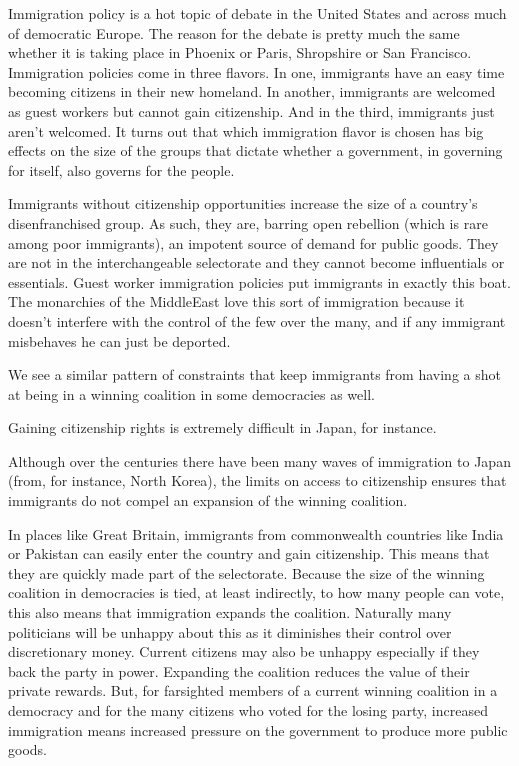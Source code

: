 \documentclass[10pt]{article}
\begin{document}
{\large Immigration policy is a hot topic of debate in the United States and
across much of democratic Europe. The reason for the debate is pretty much the
same whether it is taking place in Phoenix or Paris, Shropshire or San Francisco.
Immigration policies come in three flavors. In one, immigrants have an easy time
becoming citizens in their new homeland. In another, immigrants are welcomed as
guest workers but cannot gain citizenship. And in the third, immigrants just
aren't welcomed. It turns out that which immigration flavor is chosen has big
effects on the size of the groups that dictate whether a government, in governing
for itself, also governs for the people.}

{\large Immigrants without citizenship opportunities increase the size of a
country's disenfranchised group. As such, they are, barring open rebellion (which
is rare among poor immigrants), an impotent source of demand for public goods.
They are not in the interchangeable selectorate and they cannot become
influentials or essentials. Guest worker immigration policies put immigrants in
exactly this boat. The monarchies of the MiddleEast love this sort of immigration
because it doesn't interfere with the control of the few over the many, and if
any immigrant misbehaves he can just be deported.}

{\large We see a similar pattern of constraints that keep immigrants from having
a shot at being in a winning coalition in some democracies as well.}

{\large Gaining citizenship rights is extremely difficult in Japan, for
instance.}

{\large Although over the centuries there have been many waves of immigration to
Japan (from, for instance, North Korea), the limits on access to citizenship
ensures that immigrants do not compel an expansion of the winning coalition.}

{\large In places like Great Britain, immigrants from commonwealth countries
like India or Pakistan can easily enter the country and gain citizenship. This
means that they are quickly made part of the selectorate. Because the size of the
winning coalition in democracies is tied, at least indirectly, to how many people
can vote, this also means that immigration expands the coalition. Naturally many
politicians will be unhappy about this as it diminishes their control over
discretionary money. Current citizens may also be unhappy especially if they back
the party in power. Expanding the coalition reduces the value of their private
rewards. But, for farsighted members of a current winning coalition in a
democracy and for the many citizens who voted for the losing party, increased
immigration means increased pressure on the government to produce more public
goods.}
\end{document}
